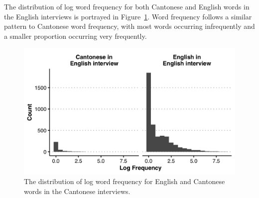 The distribution of log word frequency for both Cantonese and English words in the English interviews is portrayed in Figure~\ref{ch2:fig:englishwordfrequency}. Word frequency follows a similar pattern to Cantonese word frequency, with most words occurring infrequently and a smaller proportion occurring very frequently.

\begin{figure}[th]
  \begin{center}
  \includegraphics[width=4.9in]{figures/ch2_englishwordfrequency_5in.png} 
  \caption{The distribution of log word frequency for English and Cantonese words in the Cantonese interviews.}
  \label{ch2:fig:englishwordfrequency}
  \end{center}
\end{figure}

